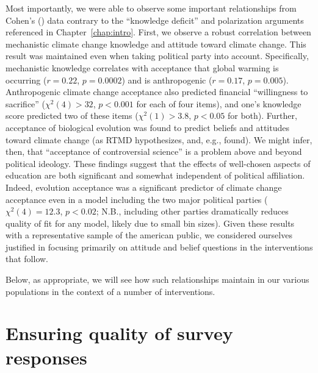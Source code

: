 Most importantly, we were able to observe some important relationships from
Cohen’s (\citeyear{cohen_san_2012_f}) data contrary to the “knowledge deficit”
and polarization arguments referenced in Chapter~\ref{chap:intro}. 
First, we observe a robust correlation between mechanistic climate change
knowledge and attitude toward climate change.  This result was maintained even
when taking political party into account.  Specifically, mechanistic knowledge
correlates with acceptance that global warming is occurring ($r=0.22$,
$p=0.0002$) and is anthropogenic ($r=0.17$, $p=0.005$).  Anthropogenic climate
change acceptance also predicted financial “willingness to sacrifice” ($χ^2(4) >
32$, $p<0.001$ for each of four items), and one’s knowledge score predicted two
of these items ($χ^2(1) > 3.8$, $p<0.05$ for both). Further, acceptance of
biological evolution was found to predict beliefs and attitudes toward climate
change (as RTMD hypothesizes, and, e.g., \cite{ranney_why_2012} found). We might
infer, then, that “acceptance of controversial science” is a problem above and
beyond political ideology. These findings suggest that the effects of
well-chosen aspects of education are both significant and somewhat independent
of political affiliation. Indeed, evolution acceptance was a significant
predictor of climate change acceptance even in a model including the two major
political parties ($\chi^2(4)=12.3$, $p<0.02$; N.B., including other parties
dramatically reduces quality of fit for any model, likely due to small bin
sizes). Given these results with a representative sample of the american public,
we considered ourselves justified in focusing primarily on attitude and belief
questions in the interventions that follow.

Below, as appropriate, we will see how such relationships maintain
in our various populations in the context of a number of interventions.

% 

\section{Ensuring quality of survey responses}
\label{sec:attitude-quality}

